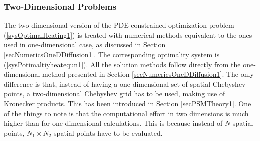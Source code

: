 \subsubsection*{Two-Dimensional Problems}\label{sec2Dprobsnum1}
The two dimensional version of the PDE constrained optimization problem (\ref{sysOptimalHeating1}) is treated with numerical methods equivalent to the ones used in one-dimensional case, as discussed in Section \ref{secNumericsOneDDiffusion1}. 
The corresponding optimality system is (\ref{sysPotimaltiyheatequn1}).
All the solution methods follow directly from the one-dimensional method presented in Section \ref{secNumericsOneDDiffusion1}. The only difference is that, instead of having a one-dimensional set of spatial Chebyshev points, a two-dimensional Chebyshev grid has to be used, making use of Kronecker products. This has been introduced in Section \ref{secPSMTheory1}.
One of the things to note is that the computational effort in two dimensions is much higher than for one dimensional calculations. This is because instead of $N$ spatial points, $N_1 \times N_2$ spatial points have to be evaluated.

